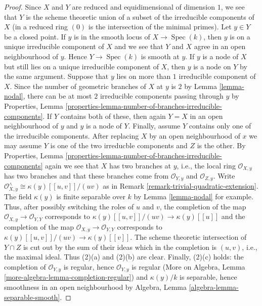 \documentclass{stacks-project}
\theoremstyle{plain}
\theoremstyle{definition}
\theoremstyle{remark}
\numberwithin{equation}{subsection}
\def\Spec{\mathop{\mathrm{Spec}}}
\begin{document}
\begin{proof}
Since $X$ and $Y$ are reduced and equidimensional of dimension $1$,
we see that $Y$ is the scheme theoretic union of a subset of the
irreducible components of $X$ (in a reduced ring $(0)$
is the intersection of the minimal primes).
Let $y \in Y$ be a closed point.
If $y$ is in the smooth locus of
$X \to \Spec(k)$, then $y$ is on a unique irreducible component
of $X$ and we see that $Y$ and $X$ agree in an open neighbourhood
of $y$. Hence $Y \to \Spec(k)$ is smooth at $y$.
If $y$ is a node of $X$ but still lies on a unique irreducible
component of $X$, then $y$ is a node on $Y$ by the same argument.
Suppose that $y$ lies on more than $1$ irreducible component of $X$.
Since the number of geometric branches of $X$ at $y$ is $2$
by Lemma \ref{lemma-nodal},
there can be at most $2$ irreducible components passing through $y$
by Properties, Lemma
\ref{properties-lemma-number-of-branches-irreducible-components}.
If $Y$ contains both of these, then again $Y = X$ in an open neighbourhood
of $y$ and $y$ is a node of $Y$. Finally, assume $Y$ contains only one
of the irreducible components. After replacing $X$ by an open
neighbourhood of $x$ we may assume $Y$ is one of the two
irreducble components and $Z$ is the other. By Properties, Lemma
\ref{properties-lemma-number-of-branches-irreducible-components}
again we see that $X$ has two branches at $y$, i.e., the local ring
$\mathcal{O}_{X, y}$ has two branches and that these branches
come from $\mathcal{O}_{Y, y}$ and $\mathcal{O}_{Z, y}$. Write
$\mathcal{O}_{X, y}^\wedge \cong \kappa(y)[[u, v]]/(uv)$
as in Remark \ref{remark-trivial-quadratic-extension}.
The field $\kappa(y)$ is finite separable over $k$ by
Lemma \ref{lemma-nodal} for example.
Thus, after possibly switching the roles of $u$ and $v$,
the completion of the map
$\mathcal{O}_{X, y} \to \mathcal{O}_{Y, Y}$
corresponds to $\kappa(y)[[u, v]]/(uv) \to \kappa(y)[[u]]$
and the completion of the map
$\mathcal{O}_{X, y} \to \mathcal{O}_{Y, Y}$
corresponds to $\kappa(y)[[u, v]]/(uv) \to \kappa(y)[[v]]$.
The scheme theoretic intersection of $Y \cap Z$ is cut out
by the sum of their ideas which in the completion is $(u, v)$, i.e.,
the maximal ideal. Thus (2)(a) and (2)(b) are clear.
Finally, (2)(c) holds: the completion of $\mathcal{O}_{Y, y}$
is regular, hence $\mathcal{O}_{Y, y}$ is regular
(More on Algebra, Lemma \ref{more-algebra-lemma-completion-regular})
and $\kappa(y)/k$ is separable, hence
smoothness in an open neighbourhood
by Algebra, Lemma \ref{algebra-lemma-separable-smooth}.
\end{proof}
\end{document}
